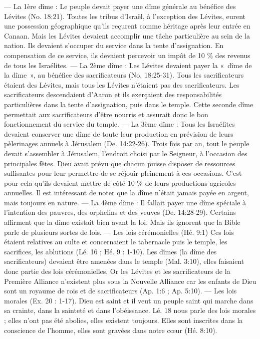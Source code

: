 \begin{multicols}{2}
{— La 1ère dîme : Le peuple devait payer une dîme générale au bénéfice des Lévites (No. 18:21).
Toutes les tribus d’Israël, à l’exception des Lévites, eurent une possession géographique qu’ils reçurent comme héritage après leur entrée en Canaan. Mais les Lévites devaient accomplir une tâche particulière au sein de la nation. Ils devaient  s’occuper du service dans la tente d’assignation. En compensation de ce service, ils devaient percevoir un impôt de 10 \% des revenus de tous les Israélites.
— La 2ème dîme : Les Lévites devaient payer la «~dîme de la dîme~», au bénéfice des sacrificateurs (No. 18:25-31).
Tous les sacrificateurs étaient des Lévites, mais tous les Lévites n’étaient pas des sacrificateurs. Les sacrificateurs descendaient d’Aaron et ils exerçaient des responsabilités particulières dans la tente d’assignation, puis dans le temple. Cette seconde dîme permettait aux sacrificateurs d’être nourris et assurait donc le bon fonctionnement du service du temple.
— La 3ème dîme : Tous les Israélites devaient conserver une dîme de toute leur production en prévision de leurs pèlerinages annuels à Jérusalem (De. 14:22-26).
Trois fois par an, tout le peuple devait s’assembler à Jérusalem, l’endroit choisi par le Seigneur, à l’occasion des principales fêtes. Dieu avait prévu que chacun puisse disposer de ressources suffisantes pour leur permettre de se réjouir pleinement à ces occasions. C’est pour cela qu’ils devaient mettre de côté 10 \% de leurs productions agricoles annuelles. Il est intéressant de noter que la dîme n’était jamais payée en argent, mais toujours en nature.
— La 4ème dîme : Il fallait payer une dîme spéciale à l’intention des pauvres, des orphelins et des veuves (De. 14:28-29). 
Certains affirment que la dîme existait bien avant la loi. Mais ils ignorent que la Bible parle de plusieurs sortes de lois.
— Les lois cérémonielles (Hé. 9:1)
Ces lois étaient relatives au culte et concernaient le tabernacle puis le temple,  les sacrifices, les ablutions (Lé. 16 ; Hé. 9 : 1-10). Les dîmes (la dîme des sacrificateurs) devaient être amenées dans le temple (Mal. 3:10), elles faisaient donc partie des lois cérémonielles. Or les Lévites et les sacrificateurs de la Première Alliance n’existent plus sous la Nouvelle Alliance car les enfants de Dieu sont un royaume de rois et de sacrificateurs (Ap. 1:6 ; Ap. 5:10).
— Les lois morales (Ex. 20 : 1-17). Dieu est saint et il veut un peuple saint qui marche dans sa crainte, dans la sainteté et dans l’obéissance. Lé. 18 nous parle des lois morales ; elles n’ont pas été abolies, elles existent toujours. Elles sont inscrites dans la conscience de l’homme, elles sont gravées dans notre cœur (Hé. 8:10).
}
\end{multicols}
